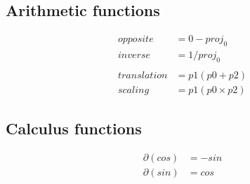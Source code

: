 \documentclass[a4paper]{article}
\begin{document}
\subsection{Arithmetic functions}
\begin{equation*}
\begin{array}{ll}
opposite    &= 0 - proj_0 \\
inverse     &= 1 / proj_0 \\
\\
translation &= p1(p0 + p2) \\
scaling     &= p1(p0 \times p2)
\end{array}
\end{equation*}

\subsection{Calculus functions}
\begin{equation*}
\begin{array}{ll}
\partial(cos) &= - sin \\
\partial(sin) &= cos \\
\end{array}
\end{equation*}



\end{document}
